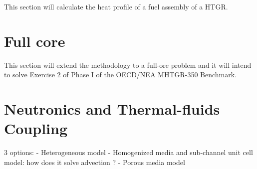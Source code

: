 This section will calculate the heat profile of a fuel assembly of a HTGR.

\section{Full core}

This section will extend the methodology to a full-ore problem and it will intend to solve Exercise 2 of Phase I of the OECD/NEA MHTGR-350 Benchmark.

\section{Neutronics and Thermal-fluids Coupling}

3 options:
- Heterogeneous model
- Homogenized media and sub-channel unit cell model: how does it solve advection ?
- Porous media model


